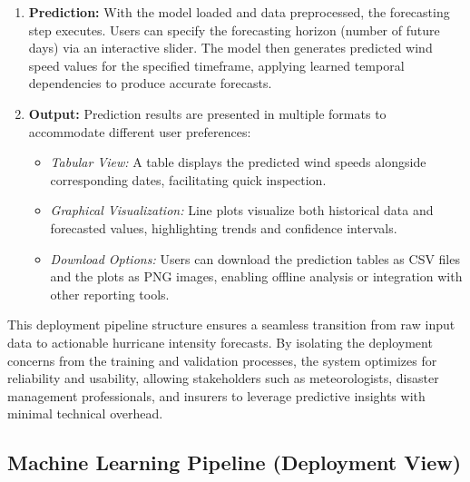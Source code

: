 \begin{enumerate}
	\item \textbf{Prediction:}
	With the model loaded and data preprocessed, the forecasting step executes. Users can specify the forecasting horizon (number of future days) via an interactive slider. The model then generates predicted wind speed values for the specified timeframe, applying learned temporal dependencies to produce accurate forecasts.
	
	\item \textbf{Output:}
	Prediction results are presented in multiple formats to accommodate different user preferences:
	\begin{itemize}
		\item \emph{Tabular View:} A table displays the predicted wind speeds alongside corresponding dates, facilitating quick inspection.
		\item \emph{Graphical Visualization:} Line plots visualize both historical data and forecasted values, highlighting trends and confidence intervals.
		\item \emph{Download Options:} Users can download the prediction tables as CSV files and the plots as PNG images, enabling offline analysis or integration with other reporting tools.
	\end{itemize}
\end{enumerate}

This deployment pipeline structure ensures a seamless transition from raw input data to actionable hurricane intensity forecasts. By isolating the deployment concerns from the training and validation processes, the system optimizes for reliability and usability, allowing stakeholders such as meteorologists, disaster management professionals, and insurers to leverage predictive insights with minimal technical overhead.


\subsection{Machine Learning Pipeline (Deployment View)}

